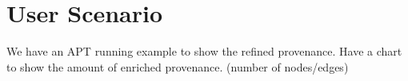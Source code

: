 \section{User Scenario}
\label{s:scenario}

We have an APT running example to show the refined provenance.
Have a chart to show the amount of enriched provenance. (number of nodes/edges)


